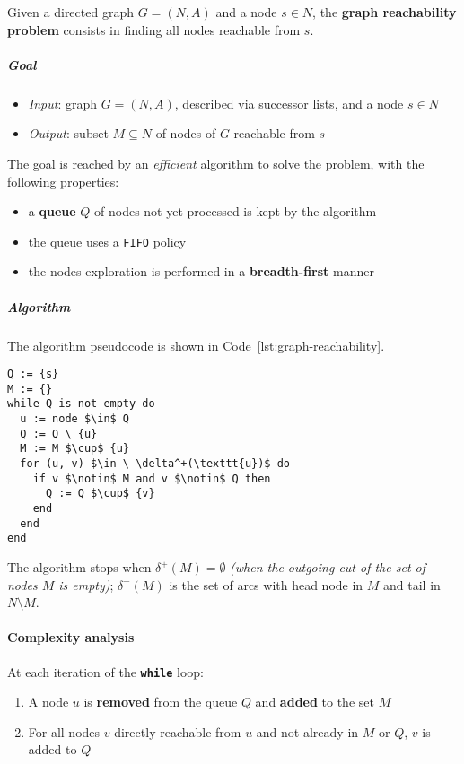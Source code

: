 \documentclass[english]{article}
\begin{document}
\begin{problem}
Given a directed graph \(G = (N, A)\) and a node \(s \in N\), the \textbf{graph reachability problem} consists in finding all nodes reachable from \(s\).
\end{problem}

\subparagraph*{Goal}
\begin{itemize}[label=\(\rightarrow\)]
  \item \textit{Input}: graph \(G = (N, A)\), described via successor lists, and a node \(s \in N\)
  \item \textit{Output}: subset \(M \subseteq N\) of nodes of \(G\) reachable from \(s\)
\end{itemize}

The goal is reached by an \textit{efficient} algorithm to solve the problem, with the following properties:
\begin{itemize}
  \item a \textbf{queue} \(Q\) of nodes not yet processed is kept by the algorithm
  \item the queue uses a \texttt{FIFO} policy
  \item the nodes exploration is performed in a \textbf{breadth-first} manner
\end{itemize}

\subparagraph*{Algorithm}
The algorithm pseudocode is shown in Code~\ref{lst:graph-reachability}.

\begin{lstlisting}[caption={Graph reachability}, label={lst:graph-reachability}, float]
Q := {s}
M := {}
while Q is not empty do
  u := node $\in$ Q
  Q := Q \ {u}
  M := M $\cup$ {u}
  for (u, v) $\in \ \delta^+(\texttt{u})$ do
    if v $\notin$ M and v $\notin$ Q then
      Q := Q $\cup$ {v}
    end
  end
end
\end{lstlisting}

The algorithm stops when \(\delta^+(M) = \emptyset\) \textit{(when the outgoing cut of the set of nodes \(M\) is empty)};
\(\delta^-(M)\) is the set of arcs with head node in \(M\) and tail in \(N \setminus M\).

\paragraph{Complexity analysis}

At each iteration of the \texttt{\textbf{while}} loop:

\begin{enumerate}
  \item A node \(u\) is \textbf{removed} from the queue \(Q\) and \textbf{added} to the set \(M\)
  \item For all nodes \(v\) directly reachable from \(u\) and not already in \(M\) or \(Q\), \(v\) is added to \(Q\)
\end{enumerate}
\end{document}
